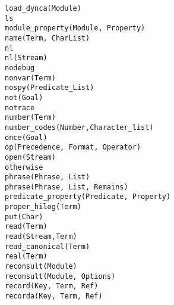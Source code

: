 \begin{tabbing}
 \> {\tt load\_dynca(Module)}	\>					\\
 \> {\tt ls}			\>					\\
 \> {\tt module\_property(Module, Property)} \>				\\
 \> {\tt name(Term, CharList)}	\>					\\
 \> {\tt nl}			\>					\\
 \> {\tt nl(Stream)}		\>					\\
 \> {\tt nodebug}		\>					\\
 \> {\tt nonvar(Term)}		\>					\\
 \> {\tt nospy(Predicate\_List)} \>					\\
 \> {\tt not(Goal)}		\>					\\
 \> {\tt notrace}		\>					\\
 \> {\tt number(Term)}		\>					\\
 \> {\tt number\_codes(Number,Character\_list)}		\>		\\
 \> {\tt once(Goal)}		\>					\\
 \> {\tt op(Precedence, Format, Operator)} \>				\\
 \> {\tt open(Stream)}		\>					\\
 \> {\tt otherwise}		\>					\\
 \> {\tt phrase(Phrase, List)}	\>					\\
 \> {\tt phrase(Phrase, List, Remains)}	\>				\\
 \> {\tt predicate\_property(Predicate, Property)} \>			\\
 \> {\tt proper\_hilog(Term)}	\>					\\
 \> {\tt put(Char)}		\>					\\
 \> {\tt read(Term)}		\>					\\
 \> {\tt read(Stream,Term)}		\>				\\
 \> {\tt read\_canonical(Term)}		\>				\\
 \> {\tt real(Term)}		\>					\\
 \> {\tt reconsult(Module)}	\>					\\
 \> {\tt reconsult(Module, Options)} \>					\\
 \> {\tt record(Key, Term, Ref)} \>					\\
 \> {\tt recorda(Key, Term, Ref)} \>					\\

\end{tabbing}
